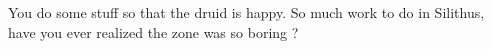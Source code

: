 

You do some stuff so that the druid is happy. So much work to do in Silithus, have you ever realized the zone was so boring ?

